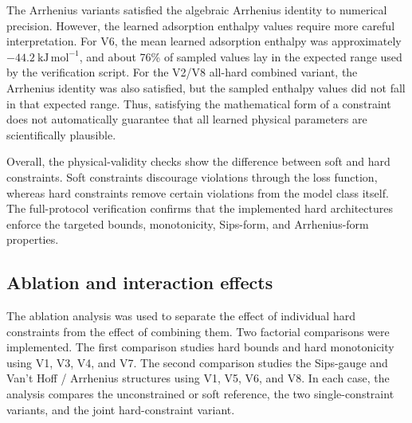 \documentclass[11pt]{article}
\begin{document}
The Arrhenius variants satisfied the algebraic Arrhenius identity to numerical
precision. However, the learned adsorption enthalpy values require more careful
interpretation. For V6, the mean learned adsorption enthalpy was approximately
\(-44.2~\mathrm{kJ\,mol^{-1}}\), and about 76\% of sampled values lay in the
expected range used by the verification script. For the V2/V8 all-hard combined
variant, the
Arrhenius identity was also satisfied, but the sampled enthalpy values did not
fall in that expected range. Thus, satisfying the mathematical form of a
constraint does not automatically guarantee that all learned physical
parameters are scientifically plausible.

Overall, the physical-validity checks show the difference between soft and hard
constraints. Soft constraints discourage violations through the loss function,
whereas hard constraints remove certain violations from the model class itself.
The full-protocol verification confirms that the implemented hard architectures
enforce the targeted bounds, monotonicity, Sips-form, and Arrhenius-form
properties.

\subsection{Ablation and interaction effects}

The ablation analysis was used to separate the effect of individual hard
constraints from the effect of combining them. Two factorial comparisons were
implemented. The first comparison studies hard bounds and hard monotonicity
using V1, V3, V4, and V7. The second comparison studies the Sips-gauge and
Van't Hoff / Arrhenius structures using V1, V5, V6, and V8. In each case, the
analysis compares the unconstrained or soft reference, the two single-constraint
variants, and the joint hard-constraint variant.
\end{document}

